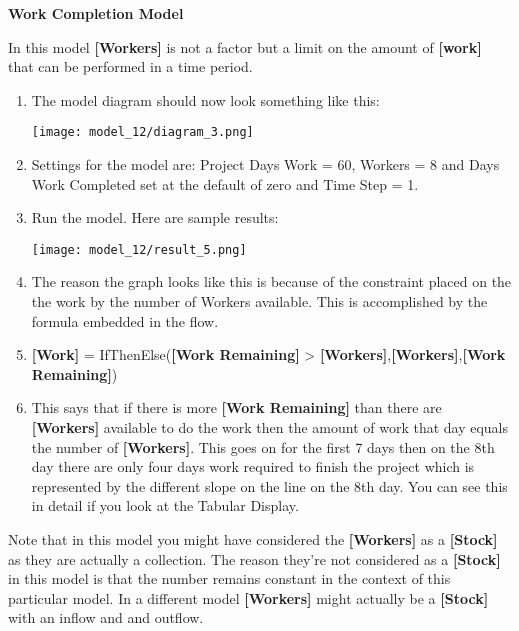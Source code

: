 \documentclass[]{memoir}
\makeatletter
\def\maxwidth{\ifdim\Gin@nat@width>\linewidth\linewidth
\else\Gin@nat@width\fi}
\let\Oldincludegraphics\includegraphics
\renewcommand{\includegraphics}[1]{\Oldincludegraphics[width=\maxwidth]{#1}}
\newcommand{\p}[1]{\textbf{{[}#1{]}}}
\makeatother
\begin{document}
\begin{oframed}\textbf{Work Completion Model} 

 In this model \p{Workers} is not a factor but a limit on the amount of \p{work} that can be performed in a time period.

\begin{enumerate}
\item The model diagram should now look something like this: \par \begin{minipage}{\linewidth}  \centering \texttt{[image: model\_12/diagram\_3.png]}
\end{minipage}
\item 

Settings for the model are: Project Days Work = 60, Workers = 8 and Days Work Completed set at the default of zero and Time Step = 1.


\item Run the model. Here are sample results:\par \begin{minipage}{\linewidth}  \centering \texttt{[image: model\_12/result\_5.png]}
\end{minipage}
\item 

The reason the graph looks like this is because of the constraint placed on the the work by the number of Workers available. This is accomplished by the formula embedded in the flow.


\item 

\p{Work} = IfThenElse(\p{Work Remaining} > \p{Workers},\p{Workers},\p{Work Remaining})


\item 

This says that if there is more \p{Work Remaining} than there are \p{Workers} available to do the work then the amount of work that day equals the number of \p{Workers}. This goes on for the first 7 days then on the 8th day there are only four days work required to finish the project which is represented by the different slope on the line on the 8th day. You can see this in detail if you look at the Tabular Display.



\end{enumerate} \end{oframed}

Note that in this model you might have considered the \p{Workers} as a
\p{Stock} as they are actually a collection. The reason they're not
considered as a \p{Stock} in this model is that the number remains
constant in the context of this particular model. In a different model
\p{Workers} might actually be a \p{Stock} with an inflow and and
outflow.
\end{document}
